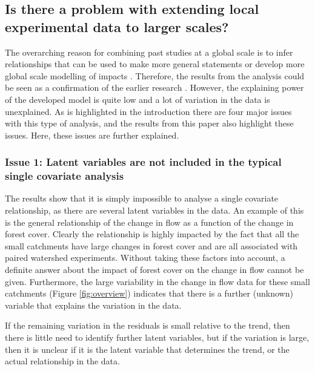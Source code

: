 \documentclass[]{elsarticle} %
\begin{document}
\hypertarget{is-there-a-problem-with-extending-local-experimental-data-to-larger-scales}{%
\subsection{Is there a problem with extending local experimental data to larger scales?}\label{is-there-a-problem-with-extending-local-experimental-data-to-larger-scales}}

The overarching reason for combining past studies at a global scale is to infer relationships that can be used to make more general statements or develop more global scale modelling of impacts \citep[i.e.][]{zhou2015, jackson2005, hoekvandijke2022}. Therefore, the results from the analysis could be seen as a confirmation of the earlier research \citep{zhang2017, filoso2017, zhou2015, jackson2005}. However, the explaining power of the developed model is quite low and a lot of variation in the data is unexplained. As is highlighted in the introduction there are four major issues with this type of analysis, and the results from this paper also highlight these issues. Here, these issues are further explained.

\hypertarget{issue-1-latent-variables-are-not-included-in-the-typical-single-covariate-analysis}{%
\subsubsection{Issue 1: Latent variables are not included in the typical single covariate analysis}\label{issue-1-latent-variables-are-not-included-in-the-typical-single-covariate-analysis}}

The results show that it is simply impossible to analyse a single covariate relationship, as there are several latent variables in the data. An example of this is the general relationship of the change in flow as a function of the change in forest cover. Clearly the relationship is highly impacted by the fact that all the small catchments have large changes in forest cover and are all associated with paired watershed experiments. Without taking these factors into account, a definite answer about the impact of forest cover on the change in flow cannot be given. Furthermore, the large variability in the change in flow data for these small catchments (Figure \ref{fig:overview}) indicates that there is a further (unknown) variable that explains the variation in the data.

If the remaining variation in the residuals is small relative to the trend, then there is little need to identify further latent variables, but if the variation is large, then it is unclear if it is the latent variable that determines the trend, or the actual relationship in the data.
\end{document}

